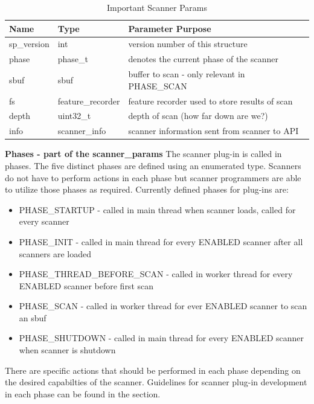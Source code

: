 \documentclass[11pt,fleqn]{article} %
\begin{document}
\begin{table}[ht]
\centering
\caption{Important Scanner Params}
\label{tab:ScannerParams}
\begin{tabular}{|p{2 cm}|p{3 cm}|p{9 cm}|}
\hline \hline
\textbf{Name} & \textbf{Type} & \textbf{Parameter Purpose} \\
\hline
sp\_version  & int & version number of this structure \\
\hline
phase & phase\_t & denotes the current phase of the scanner \\
\hline
sbuf & sbuf & buffer to scan - only relevant in PHASE\_SCAN \\
\hline
fs & feature\_recorder & feature recorder used to store results of scan \\
\hline
depth & uint32\_t & depth of scan (how far down are we?) \\
\hline
info & scanner\_info & scanner information sent from scanner to API \\
\hline
\end{tabular}
\end{table}

\textbf{Phases - part of the scanner\_params}
The scanner plug-in is called in phases.   The five distinct phases are defined using an enumerated type. Scanners do not have to perform actions in each phase but scanner programmers are able to utilize those phases as required. Currently defined phases for plug-ins are:

\begin{itemize}
	\item PHASE\_STARTUP - called in main thread when scanner loads, called for every scanner
	\item PHASE\_INIT - called in main thread for every ENABLED scanner after all scanners are loaded
	\item PHASE\_THREAD\_BEFORE\_SCAN - called in worker thread for every ENABLED scanner before first scan
	\item PHASE\_SCAN  - called in worker thread for ever ENABLED scanner to scan an sbuf
	\item PHASE\_SHUTDOWN - called in main thread for every ENABLED scanner when scanner is shutdown
\end{itemize}

There are specific actions that should be performed in each phase depending on the desired capabilties of the scanner. Guidelines for scanner plug-in development in each phase can be found in the  section.\\
\end{document}
